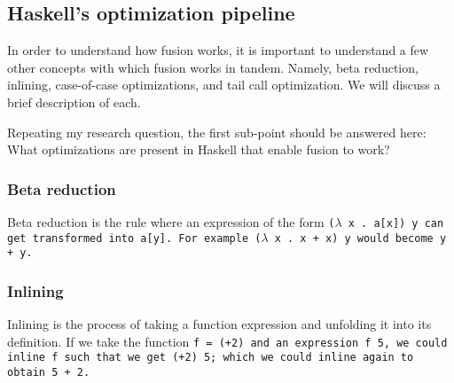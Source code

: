 \subsection{Haskell's optimization pipeline}
In order to understand how fusion works, it is important to understand a few other concepts with which fusion works in tandem.
Namely, beta reduction, inlining, case-of-case optimizations, and tail call optimization.
We will discuss a brief description of each.

Repeating my research question, the first sub-point should be answered here:
What optimizations are present in Haskell that enable fusion to work?

\subsubsection{Beta reduction}
Beta reduction is the rule where an expression of the form \tt{($\lambda$ x . a[x]) y} can get transformed into \tt{a[y]}.
For example \tt{($\lambda$ x . x + x) y} would become \tt{y + y}.
\subsubsection{Inlining}
Inlining is the process of taking a function expression and unfolding it into its definition.
If we take the function \tt{f = (+2)} and an expression \tt{f 5}, we could inline \tt{f} such that we get \tt{(+2) 5}; which we could inline again to obtain \tt{5 + 2}.
